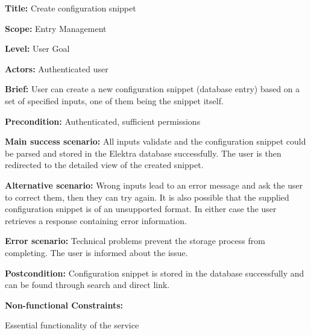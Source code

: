 
\begin{DoxyItemize}
\item {\bfseries Title\+:} Create configuration snippet
\item {\bfseries Scope\+:} Entry Management
\item {\bfseries Level\+:} User Goal
\item {\bfseries Actors\+:} Authenticated user
\item {\bfseries Brief\+:} User can create a new configuration snippet (database entry) based on a set of specified inputs, one of them being the snippet itself.
\end{DoxyItemize}


\begin{DoxyItemize}
\item {\bfseries Precondition\+:} Authenticated, sufficient permissions
\item {\bfseries Main success scenario\+:} All inputs validate and the configuration snippet could be parsed and stored in the Elektra database successfully. The user is then redirected to the detailed view of the created snippet.
\item {\bfseries Alternative scenario\+:} Wrong inputs lead to an error message and ask the user to correct them, then they can try again. It is also possible that the supplied configuration snippet is of an unsupported format. In either case the user retrieves a response containing error information.
\item {\bfseries Error scenario\+:} Technical problems prevent the storage process from completing. The user is informed about the issue.
\item {\bfseries Postcondition\+:} Configuration snippet is stored in the database successfully and can be found through search and direct link.
\item {\bfseries Non-\/functional Constraints\+:}
\begin{DoxyItemize}
\item Essential functionality of the service 
\end{DoxyItemize}
\end{DoxyItemize}
